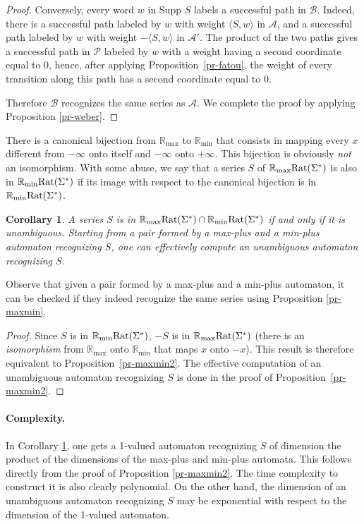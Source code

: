 \documentclass{article}
\newtheorem{crllr}[thrm]{Corollary}
\newcommand{\mrm}[1]{\text{\rm #1}}
\newcommand{\supp}[1]{\text{Supp }#1}
\def\cA{{\mathcal A}}
\def\cB{{\mathcal B}}
\def\cP{{\mathcal P}}
\newcommand{\R} {\ensuremath{\mathbb{R}}}
\newcommand{\Rmin} {\R_{\min}}
\newcommand{\Rmax} {\R_{\max}}
\newcommand{\1}{\mathbb{1}}
\newcommand{\0}{\mathbb{0}}
\newcommand{\coef}[2]{\langle #1, #2\rangle}
\def\ab{\Sigma}
\begin{document}
\begin{proof}
Conversely, every word $w$ in $\supp{S}$ labels a successful path in $\cB$.
Indeed, there is a successful path labeled by $w$ with weight $\coef{S}{w}$ in $\cA$,
and a successful path labeled by $w$ with weight $-\coef{S}{w}$ in $\cA'$.
The product of the two paths gives a successful path in
$\cP$ labeled by $w$ with a weight
having a second coordinate equal to $0$, hence, after applying
Proposition~\ref{pr-fatou}, the weight of every transition along this path has
a second coordinate equal to $0$. 

Therefore $\cB$ recognizes the same series as $\cA$. We complete the
proof by applying Proposition \ref{pr-weber}. 
\end{proof}

There is a canonical bijection from $\Rmax$ to $\Rmin$ that consists
in mapping every $x$ different from $-\infty$ onto itself and $-\infty$
onto $+\infty$. This bijection is obviously {\it not} an isomorphism.
With some abuse, we say that a series $S$ of $\Rmax\mrm{Rat}(\ab^*)$ is also
in $\Rmin\mrm{Rat}(\ab^*)$ if its image with respect to the canonical bijection
is in $\Rmin\mrm{Rat}(\ab^*)$.

\begin{crllr}
\label{pr-maxmin3}
A series $S$ is in $\Rmax\mrm{Rat}(\ab^*)\cap\Rmin\mrm{Rat}(\ab^*)$ if and
only if it is unambiguous. Starting from a pair formed by a max-plus
and a min-plus automaton recognizing $S$, one can effectively compute an
unambiguous automaton recognizing $S$. 
\end{crllr}

Observe that given a pair
formed by a max-plus and a min-plus automaton, it can be checked if
they indeed recognize the same series using Proposition
\ref{pr-maxmin}. 

\begin{proof}
Since $S$ is in $\Rmin\mrm{Rat}(\ab^*)$,
$-S$ is in $\Rmax\mrm{Rat}(\ab^*)$ (there is an {\it isomorphism}
from $\Rmax$ onto $\Rmin$ that maps $x$ onto $-x$). This result is
therefore equivalent to Proposition~\ref{pr-maxmin2}. The effective
computation of an unambiguous automaton recognizing $S$ is done in the
proof of Proposition~\ref{pr-maxmin2}. 
\end{proof}

\paragraph{Complexity.} In Corollary \ref{pr-maxmin3}, one gets 
a 1-valued automaton recognizing $S$ of dimension the product of the dimensions
of the max-plus and min-plus automata. This follows directly from the proof of
Proposition \ref{pr-maxmin2}. The time complexity to construct it is
also clearly polynomial. 
On the other hand, the dimension of an unambiguous automaton
recognizing $S$ may be exponential with respect to the dimension of
the 1-valued automaton. 
\end{document}
